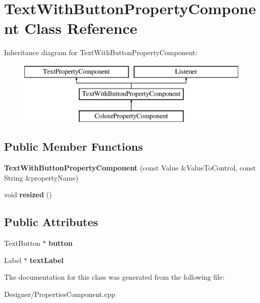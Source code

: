 \hypertarget{class_text_with_button_property_component}{\section{Text\-With\-Button\-Property\-Component Class Reference}
\label{class_text_with_button_property_component}
}
Inheritance diagram for Text\-With\-Button\-Property\-Component\-:\begin{figure}[H]
\begin{center}
\leavevmode
\includegraphics[height=3.000000cm]{class_text_with_button_property_component}
\end{center}
\end{figure}
\subsection*{Public Member Functions}
\begin{DoxyCompactItemize}
\item 
\hypertarget{class_text_with_button_property_component_a6e0602af61cefd723f2de39afc30bbdd}{{\bfseries Text\-With\-Button\-Property\-Component} (const Value \&Value\-To\-Control, const String \&property\-Name)}\label{class_text_with_button_property_component_a6e0602af61cefd723f2de39afc30bbdd}

\item 
\hypertarget{class_text_with_button_property_component_a8c9ffa8ad1454bff3af84d58133b7c0c}{void {\bfseries resized} ()}\label{class_text_with_button_property_component_a8c9ffa8ad1454bff3af84d58133b7c0c}

\end{DoxyCompactItemize}
\subsection*{Public Attributes}
\begin{DoxyCompactItemize}
\item 
\hypertarget{class_text_with_button_property_component_a82ee855aed4a255728c610dda7f7821b}{Text\-Button $\ast$ {\bfseries button}}\label{class_text_with_button_property_component_a82ee855aed4a255728c610dda7f7821b}

\item 
\hypertarget{class_text_with_button_property_component_a55480a356c71b7ed5b81fcbf0e390a68}{Label $\ast$ {\bfseries text\-Label}}\label{class_text_with_button_property_component_a55480a356c71b7ed5b81fcbf0e390a68}

\end{DoxyCompactItemize}


The documentation for this class was generated from the following file\-:\begin{DoxyCompactItemize}
\item 
Designer/Properties\-Component.\-cpp\end{DoxyCompactItemize}
